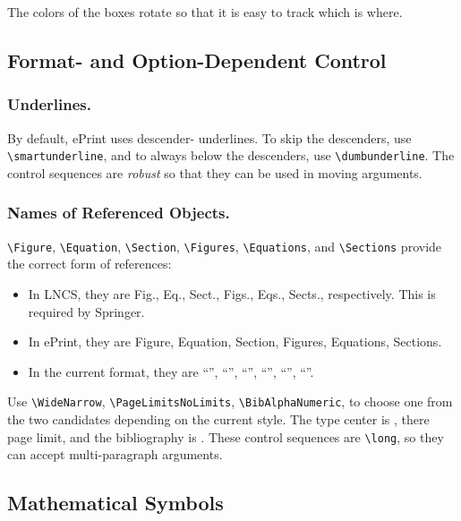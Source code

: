 The colors of the boxes rotate so that it is easy to track which is where.

\subsection{Format- and Option-Dependent Control }

\subsubsection{Underlines.}
By default, ePrint uses descender- underlines.
To  skip the descenders,
use \texttt{\textbackslash smartunderline}, and
to always  below the descenders,
use \texttt{\textbackslash dumbunderline}.
The control sequences are \emph{robust} so that
they can be used in moving arguments.

\subsubsection{Names of Referenced Objects.}
\texttt{\textbackslash Figure},
\texttt{\textbackslash Equation},
\texttt{\textbackslash Section},
\texttt{\textbackslash Figures},
\texttt{\textbackslash Equations}, and
\texttt{\textbackslash Sections}
provide the correct form of references:
\begin{itemize}
\item
In LNCS, they are Fig., Eq., Sect., Figs., Eqs., Sects., respectively.
This is required by Springer.
\item
In ePrint, they are Figure, Equation, Section, Figures, Equations, Sections.
\item
In the current format, they are
``\Figure'', ``\Equation'', ``\Section'',
``\Figures'', ``\Equations'', ``\Sections''.
\end{itemize}
Use
\texttt{\textbackslash WideNarrow},
\texttt{\textbackslash PageLimitsNoLimits},
\texttt{\textbackslash BibAlphaNumeric},
to choose one from the two candidates depending on the current style.
The type center is ,
there  page limit,
and the bibliography is .
These control sequences are \texttt{\textbackslash long},
so they can accept multi-paragraph arguments.

\subsection{Mathematical Symbols}

